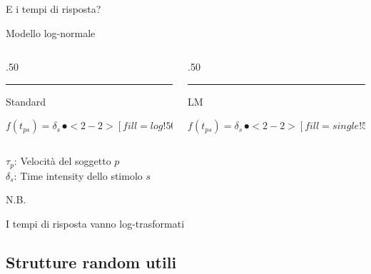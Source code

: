 \documentclass[compress]{beamer}
\begin{document}
\begin{frame}{E i tempi di risposta?}
	\begin{center}
		\Large\textcolor{log}{Modello log-normale}
	\end{center}
	
	
	\begin{columns}[T]
		\begin{column}{.50\linewidth}
						\textcolor{log}{\rule{\linewidth}{2pt}}
			\begin{center}
				\textcolor{log}{	\large{{Standard}}}
			\end{center}
			\centering
			$f (t_{ps}) =  \delta_s \, \spot<2-2>[fill=log!50]{-} \, \tau_p \, + \, \varepsilon $
		\end{column}
		\hfill
		
		\begin{column}{.50\linewidth}
				\textcolor{single}{\rule{\linewidth}{2pt}}
			\begin{center}
				\textcolor{single}{\large{{LM}}}	
			\end{center}
			\centering
			$f(t_{ps}) =  \delta_s \, \spot<2-2>[fill=single!50]{+} \, \tau_p \, +  \, \varepsilon$
		\end{column}
	\end{columns}	
	
	\vspace{3mm}
	$\tau_p$: Velocità del soggetto $p$ \\
	$\delta_s$: Time intensity dello stimolo $s$\\
	
	
	\vspace{3mm}
	\begin{alertblock}{N.B.}
		
		I tempi di risposta vanno log-trasformati
	\end{alertblock}
\end{frame}


\subsection*{Strutture random utili}
\end{document}
